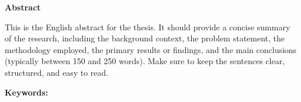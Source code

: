 \thispagestyle{plain}%

\vspace*{1.8cm}
\begin{center}
  \singlespacing%
  {\bfseries\Large \thesisTitle\par}
  \vspace{0.8\baselineskip}
  {\large \thesisAuthor\par}
  \vspace{0.8\baselineskip}
  {\large \thesisDate\par}
\end{center}

\vspace{1.5\baselineskip}

{\centering\bfseries Abstract\par}
\nopagebreak\vspace{0.5\baselineskip}

This is the English abstract for the thesis. It should provide a concise summary of the research, including the background context, the problem statement, the methodology employed, the primary results or findings, and the main conclusions (typically between 150 and 250 words). Make sure to keep the sentences clear, structured, and easy to read.

\vspace{1.5\baselineskip}
\noindent\textbf{Keywords:} \thesisKeywords\par

